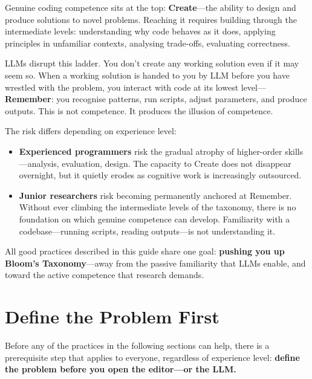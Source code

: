 \documentclass[12pt]{article}
\begin{document}
Genuine coding competence sits at the top: \textbf{Create}---the ability to design and produce solutions to novel problems.
Reaching it requires building through the intermediate levels: understanding why code behaves as it does, applying principles in unfamiliar contexts, analysing trade-offs, evaluating correctness.

LLMs disrupt this ladder. You don't create any working solution even if it may seem so. When a working solution is handed to you by LLM before you have wrestled with the problem, you interact with code at its lowest level---\textbf{Remember}: you recognise patterns, run scripts, adjust parameters, and produce outputs.
This is not competence. It produces the illusion of competence.

The risk differs depending on experience level:

\begin{itemize}
    \item \textbf{Experienced programmers} risk the gradual atrophy of higher-order skills---analysis, evaluation, design. The capacity to Create does not disappear overnight, but it quietly erodes as cognitive work is increasingly outsourced.
    \item \textbf{Junior researchers} risk becoming permanently anchored at Remember. Without ever climbing the intermediate levels of the taxonomy, there is no foundation on which genuine competence can develop. Familiarity with a codebase---running scripts, reading outputs---is not understanding it.
\end{itemize}

\begin{tcolorbox}[
    colback=red!5,
    colframe=red!70!black,
    boxrule=1pt,
    leftrule=4pt,
    arc=2pt,
    colbacktitle=red!70!black,
    title={\textbf{Key Principle}},
    fonttitle=\bfseries\color{white}
]
All good practices described in this guide share one goal: \textbf{pushing you up Bloom's Taxonomy}---away from the passive familiarity that LLMs enable, and toward the active competence that research demands.
\end{tcolorbox}


\section{Define the Problem First}

Before any of the practices in the following sections can help, there is a prerequisite step that applies to everyone, regardless of experience level: \textbf{define the problem before you open the editor---or the LLM.}
\end{document}
